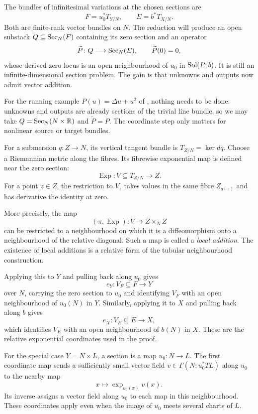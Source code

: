 The bundles of infinitesimal variations at the chosen sections are
\[
 F=u_0^*T_{Y/N},\qquad E=b^*T_{X/N}.
\]
Both are finite-rank vector bundles on $N$.
The reduction will produce an open substack
$Q\subseteq\operatorname{Sec}_N(F)$ containing its zero section and an operator
\[
 \widetilde P\colon Q\longrightarrow\operatorname{Sec}_N(E),
 \qquad \widetilde P(0)=0,
\]
whose derived zero locus is an open neighbourhood of $u_0$ in
$\operatorname{Sol}(P;b)$. It is still an infinite-dimensional section problem.
The gain is that unknowns and outputs now admit vector addition.

For the running example $P(u)=\Delta u+u^2$ of
, nothing needs to be
done: unknowns and outputs are already sections of the trivial line
bundle, so we may take $Q=\operatorname{Sec}_N(N\times\mathbb{R})$ and $\widetilde P=P$.
The coordinate step only matters for nonlinear source or target
bundles.

For a submersion $q\colon Z\to N$, its vertical tangent bundle is
$T_{Z/N}=\ker dq$. Choose a Riemannian metric along the fibres.
Its fibrewise exponential map is defined near the zero section:
\[
 \operatorname{Exp}\colon V\subseteq T_{Z/N}\longrightarrow Z.
\]
For a point $z\in Z$, the restriction to $V_z$ takes values in the
same fibre $Z_{q(z)}$ and has derivative the identity at zero.

More precisely, the map
\[
 (\pi,\operatorname{Exp})\colon V\longrightarrow Z\times_N Z
\]
can be restricted to a neighbourhood on which it is a diffeomorphism
onto a neighbourhood of the relative diagonal.
Such a map is called a \emph{local addition}.
The existence of local additions is a relative form of the tubular
neighbourhood construction.

Applying this to $Y$ and pulling back along $u_0$ gives
\[
 e_Y\colon V_F\subseteq F\longrightarrow Y
\]
over $N$, carrying the zero section to $u_0$ and identifying $V_F$
with an open neighbourhood of $u_0(N)$ in $Y$.
Similarly, applying it to $X$ and pulling back along $b$ gives
\[
 e_X\colon V_E\subseteq E\longrightarrow X,
\]
which identifies $V_E$ with an open neighbourhood of $b(N)$ in $X$.
These are the relative exponential coordinates used in the proof.

For the special case $Y=N\times L$, a section is a map $u_0\colon N\to L$.
The first coordinate map sends a sufficiently small vector field
$v\in\Gamma(N;u_0^*TL)$ along $u_0$ to the nearby map
\[
 x\longmapsto\exp_{u_0(x)}v(x).
\]
Its inverse assigns a vector field along $u_0$ to each map in this
neighbourhood. These coordinates apply even when the image of $u_0$
meets several charts of $L$.

